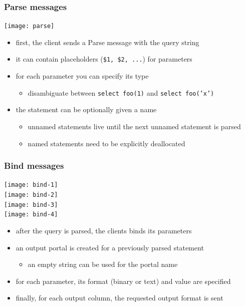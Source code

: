 \documentclass{beamer}
\begin{document}
\begin{frame}
  \frametitle{Parse messages}

  \begin{center}
    \texttt{[image: parse]}
  \end{center}

  \begin{itemize}
  \item first, the client sends a Parse message with the query string
  \item it can contain \alert{placeholders} (\texttt{\$1, \$2, ...}) for
    parameters
  \item for each parameter you can specify its \alert{type}
    \begin{itemize}
    \item disambiguate between \texttt{select foo(1)} and \texttt{select foo('x')}
    \end{itemize}
  \item the statement can be optionally given a \alert{name}
    \begin{itemize}
    \item unnamed statements live until the next unnamed statement is parsed
    \item named statements need to be explicitly deallocated
    \end{itemize}
  \end{itemize}
\end{frame}

\begin{frame}
  \frametitle{Bind messages}

  \hspace{2cm}\texttt{[image: bind-1]}\;\raisebox{0.2cm}{$+$} \\
  \hspace{2cm}\texttt{[image: bind-2]}\;\raisebox{0.2cm}{$+$} \\
  \hspace{2cm}\texttt{[image: bind-3]}\;\raisebox{0.2cm}{$+$} \\
  \hspace{2cm}\texttt{[image: bind-4]}

  \begin{itemize}
  \item after the query is parsed, the clients \alert{binds} its parameters
  \item an \alert{output portal} is created for a previously parsed statement
    \begin{itemize}
    \item an empty string can be used for the portal name
    \end{itemize}
  \item for each parameter, its \alert{format} (binary or text) and \alert{value} are specified
  \item finally, for each output column, the requested \alert{output format} is
    sent
  \end{itemize}
\end{frame}
\end{document}
